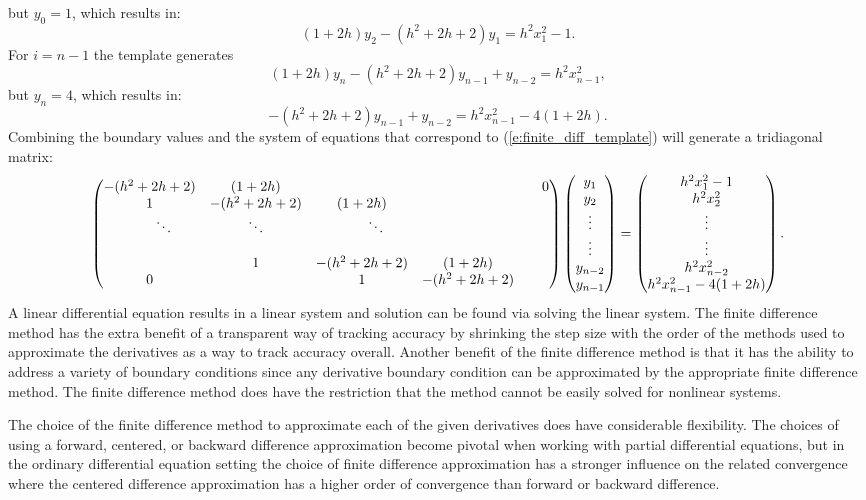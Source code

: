 \documentclass[twoside]{article}
\def\ds{\displaystyle}
\begin{document}
but $\ds y_0 = 1$, which results in:
$$(1+2h)y_{2} - (h^2+2h+2)y_1 = h^2x_1^2-1.$$
For $i=n-1$ the template generates
$$(1+2h)y_{n} - (h^2+2h+2)y_{n-1} + y_{n-2} = h^2x_{n-1}^2,$$
but $\ds y_n = 4$, which results in:
$$- (h^2+2h+2)y_{n-1} + y_{n-2} = h^2x_{n-1}^2-4(1+2h).$$
Combining the boundary values and the system of equations that correspond to (\ref{e:finite_diff_template}) will generate a tridiagonal matrix:
$$ \begin{pmatrix} -(h^2+2h+2) & (1+2h) &  & & & 0 \cr 1 & -(h^2+2h+2) & (1+2h) & & & \cr  \ \ \ \ \ \  \ddots & \ddots & \ \ \ \ \ \ \ddots &  & \cr  \cr & 1 & -(h^2+2h+2) &  (1+2h) \cr 0 &  & 1 & -(h^2+2h+2) \end{pmatrix} \begin{pmatrix} y_1 \cr y_2 \cr \vdots \cr \vdots \cr y_{n-2} \cr y_{n-1}\end{pmatrix} = \begin{pmatrix} h^2 x_1^2-1 \cr h^2x_2^2 \cr \vdots \cr \vdots \cr h^2 x_{n-2}^2 \cr h^2x_{n-1}^2-4(1+2h)\end{pmatrix}.$$
A linear differential equation results in a linear system and solution can be found via solving the linear system. The finite difference method has the extra benefit of a transparent way of tracking accuracy by shrinking the step size with the order of the methods used to approximate the derivatives as a way to track accuracy overall. Another benefit of the finite difference method is that it has the ability to address a variety of boundary conditions since any derivative boundary condition can be approximated by the appropriate finite difference method. The finite difference method does have the restriction that the method cannot be easily solved for nonlinear systems. 

The choice of the finite difference method to approximate each of the given derivatives does have considerable flexibility. The choices of using a forward, centered, or backward difference approximation become pivotal when working with partial differential equations, but in the ordinary differential equation setting the choice of finite difference approximation has a stronger influence on the related convergence where the centered difference approximation has a higher order of convergence than forward or backward difference. 
\end{document}
